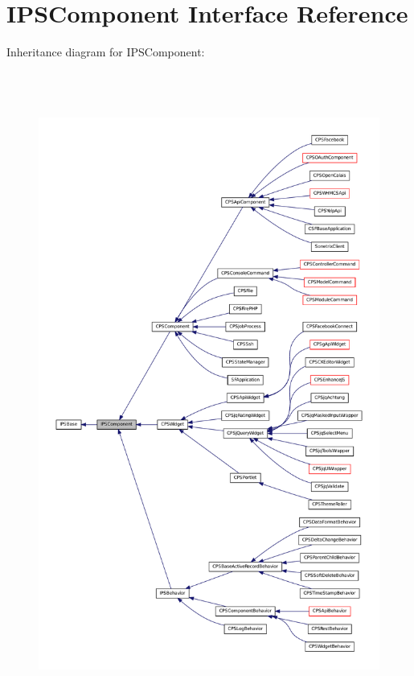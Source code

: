 \hypertarget{interfaceIPSComponent}{
\section{IPSComponent Interface Reference}
\label{interfaceIPSComponent}
}


Inheritance diagram for IPSComponent:\nopagebreak
\begin{figure}[H]
\begin{center}
\leavevmode
\includegraphics[height=600pt]{interfaceIPSComponent__inherit__graph}
\end{center}
\end{figure}


